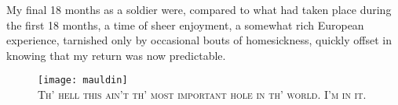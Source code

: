 \documentclass[../m3y-print]{subfiles}
\begin{document}
My final 18 months as a soldier were, compared to what had taken place during the first 18 months, a time of sheer enjoyment, a somewhat rich European experience, tarnished only by occasional bouts of homesickness, quickly offset in knowing that my return was now predictable.

\begin{figure}[b]
\centering
\texttt{[image: mauldin]}\\
\medskip
{\newtimes\textsc{Th' hell this ain't th' most important hole in th' world. I'm in it.}}
\end{figure}
\end{document}
